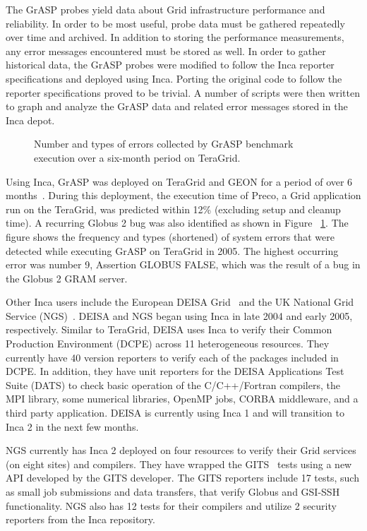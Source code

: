 \documentclass[times,10pt,twocolumn]{article}
\begin{document}
The GrASP probes yield data about Grid infrastructure performance and reliability.
In order to be most useful, probe data must be gathered 
repeatedly over time and archived.
In addition to storing the performance measurements,
any error messages encountered must be stored as well.    
In order to
gather historical data, the GrASP probes were modified
to follow the Inca reporter specifications and deployed using Inca.
Porting the original code to follow the reporter specifications proved to be
trivial.  A number of scripts were then written to graph and analyze the GrASP
data and related error messages stored in the Inca depot.  

\begin{figure}[tbp]
  \centering
  \mbox{}
  \caption{\label{errorHist_fig} Number and types of errors collected by
  GrASP benchmark execution over a six-month period on TeraGrid.}
\end{figure}

Using Inca, GrASP was deployed on TeraGrid and GEON for a period of over 6
months~\cite{grasp2}.  During this deployment, the execution time of Preco, 
a Grid application run on the TeraGrid, was predicted within 12\% (excluding setup and cleanup time).
A recurring Globus 2 bug was also identified as shown in Figure ~\ref{errorHist_fig}.  The figure shows the frequency and types (shortened) of 
system errors that were detected while executing 
GrASP on TeraGrid in 2005. The highest occurring
error was number 9, Assertion GLOBUS FALSE, which was the result of a bug in
the Globus 2 GRAM server.  


Other Inca users include the European DEISA Grid~\cite{deisa} and the UK National Grid
Service (NGS)~\cite{ngs}.  DEISA and NGS began using Inca in late 2004 and early 2005, respectively.  
Similar to TeraGrid, DEISA uses Inca to verify their Common
Production Environment (DCPE) across 11 heterogeneous resources.  They
currently have 40 version reporters to verify each of the packages included in
DCPE.  In addition, they have unit reporters for the DEISA Applications Test
Suite (DATS) to check basic operation of the C/C++/Fortran compilers, the MPI
library, some numerical libraries, OpenMP jobs, CORBA middleware, and a third
party application.  DEISA is currently using Inca 1 and will transition to
Inca 2 in the next few months.

NGS currently has Inca 2 deployed on four resources to verify their Grid services (on eight sites) and compilers.  They have wrapped the GITS~\cite{gits} tests using a new
API developed by the GITS developer.  The GITS reporters include 17 tests, 
such as small job submissions and data transfers, that verify Globus and GSI-SSH functionality.
NGS also has 12 tests for their compilers and
utilize 2 security reporters from the Inca repository.
\end{document}
